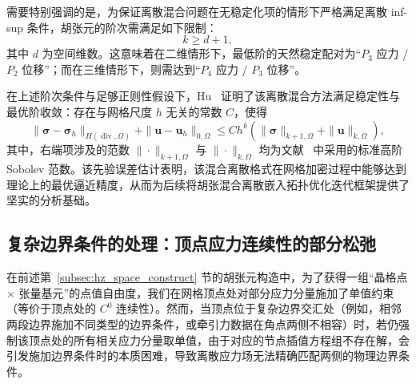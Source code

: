 需要特别强调的是，为保证离散混合问题在无稳定化项的情形下严格满足离散 inf-sup 条件，胡张元的阶次需满足如下限制：
\[
k\ge d+1,
\]
其中 $d$ 为空间维数。这意味着在二维情形下，最低阶的天然稳定配对为“$P_3$ 应力 / $P_2$ 位移”；而在三维情形下，则需达到“$P_4$ 应力 / $P_3$ 位移”。

在上述阶次条件与足够正则性假设下，Hu~\cite{huFiniteElementApproximations2015} 证明了该离散混合方法满足稳定性与最优阶收敛：存在与网格尺度 $h$ 无关的常数 $C$，使得
\begin{equation} \label{eq:ch5_hz_error_estimate}
	\|\boldsymbol\sigma - \boldsymbol\sigma_h\|_{H(\operatorname{div},\Omega)} + \|\boldsymbol{u} - \boldsymbol{u}_h\|_{0,\Omega} \le C h^k (\|\boldsymbol\sigma\|_{k+1,\Omega} + \|\boldsymbol{u}\|_{k,\Omega}),
\end{equation}
其中，右端项涉及的范数 $\|\cdot\|_{k+1,\Omega}$ 与 $\|\cdot\|_{k,\Omega}$ 均为文献~\cite{huFiniteElementApproximations2015} 中采用的标准高阶 Sobolev 范数。该先验误差估计表明，该混合离散格式在网格加密过程中能够达到理论上的最优逼近精度，从而为后续将胡张混合离散嵌入拓扑优化迭代框架提供了坚实的分析基础。


\subsection{复杂边界条件的处理：顶点应力连续性的部分松弛}
\label{subsec:vertex_relaxation}

在前述第~\ref{subsec:hz_space_construct} 节的胡张元构造中，为了获得一组“晶格点 $\times$ 张量基元”的点值自由度，我们在网格顶点处对部分应力分量施加了单值约束（等价于顶点处的 $C^0$ 连续性）。然而，当顶点位于复杂边界交汇处（例如，相邻两段边界施加不同类型的边界条件，或牵引力数据在角点两侧不相容）时，若仍强制该顶点处的所有相关应力分量取单值，由于对应的节点插值方程组不存在解，会引发施加边界条件时的本质困难，导致离散应力场无法精确匹配两侧的物理边界条件。

